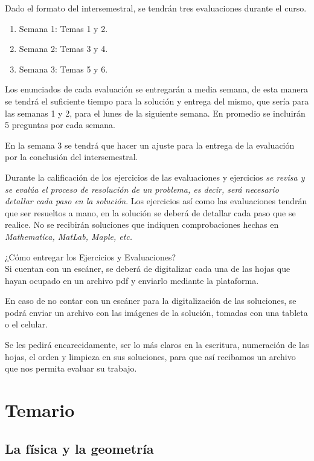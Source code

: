 Dado el formato del intersemestral, se tendrán tres evaluaciones durante el curso.

\begin{enumerate}
\item Semana 1: Temas 1 y 2.
\item Semana 2: Temas 3 y 4.
\item Semana 3: Temas 5 y 6.
\end{enumerate}

Los enunciados de cada evaluación se entregarán a media semana, de esta manera se tendrá el suficiente tiempo para la solución y entrega del mismo, que sería para las semanas 1 y 2, para el lunes de la siguiente semana. En promedio se incluirán 5 preguntas por cada semana.
\par
En la semana 3 se tendrá que hacer un ajuste para la entrega de la evaluación por la conclusión del intersemestral.
\par
Durante la calificación de los ejercicios de las evaluaciones y ejercicios  \emph{se revisa y se evalúa el proceso de resolución de un problema, es decir, será necesario detallar cada paso en la solución}. Los ejercicios así como las evaluaciones tendrán que ser resueltos a mano, en la solución se deberá de detallar cada paso que se realice. No se recibirán soluciones que indiquen comprobaciones hechas en \emph{Mathematica, MatLab, Maple, etc.}
\par 
¿Cómo entregar los Ejercicios y Evaluaciones? \\
Si cuentan con un escáner, se deberá de digitalizar cada una de las hojas que hayan ocupado en un archivo pdf y enviarlo mediante la plataforma.
\par
En caso de no contar con un escáner para la digitalización de las soluciones, se podrá enviar un archivo con las imágenes de la solución, tomadas con una tableta o el celular.
\par
Se les pedirá encarecidamente, ser lo más claros en la escritura, numeración de las hojas, el orden y limpieza en sus soluciones, para que así recibamos un archivo que nos permita evaluar su trabajo.

\section{Temario}

\subsection{La física y la geometría}

